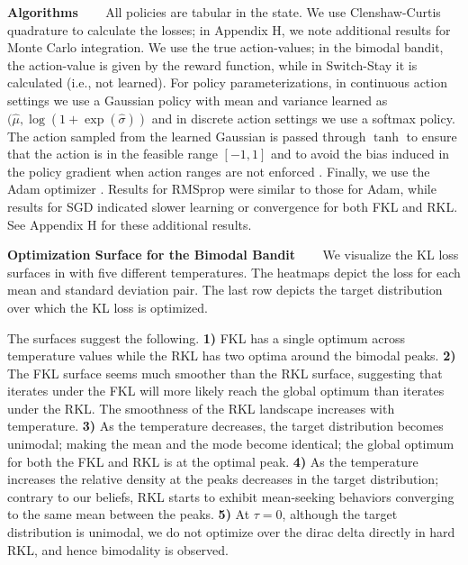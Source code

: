 \documentclass{article}
\newcommand{\myparagraph}[1]{\textbf{#1} \ \ \ }
\begin{document}
\myparagraph{Algorithms} 
All policies are tabular in the state. We use Clenshaw-Curtis quadrature \citep{clenshaw1960method} to calculate the losses; in Appendix H, we note additional results for Monte Carlo integration. We use the true action-values; in the bimodal bandit, the action-value is given by the reward function, while in Switch-Stay it is calculated (i.e., not learned). For policy parameterizations, in continuous action settings we use a Gaussian policy with mean and variance learned as $(\hat{\mu}, \log(1+\exp(\hat{\sigma}))$ and in discrete action settings we use a softmax policy. The action sampled from the learned Gaussian is passed through $\tanh$ to ensure that the action is in the feasible range $[-1, 1]$ and to avoid the bias induced in the policy gradient when action ranges are not enforced \citep{chou2017improving}. Finally, we use the Adam optimizer \citep{kingma2014adam}. Results for RMSprop were similar to those for Adam, while results for SGD indicated slower learning or convergence for both FKL and RKL. See Appendix H for these additional results. 


\myparagraph{Optimization Surface for the Bimodal Bandit}
We visualize the KL loss surfaces in  with five different temperatures. The heatmaps depict the loss for each mean and standard deviation pair. The last row depicts the target distribution over which the KL loss is optimized. 

The surfaces suggest the following. 
\textbf{1)} FKL has a single optimum across temperature values while the RKL has two optima around the bimodal peaks.
\textbf{2)} The FKL surface seems much smoother than the RKL surface, suggesting that iterates under the FKL will more likely reach the global optimum than iterates under the RKL. The smoothness of the RKL landscape increases with temperature.
\textbf{3)} As the temperature decreases, the target distribution becomes unimodal; making the mean and the mode become identical; the global optimum for both the FKL and RKL is at the optimal peak.
\textbf{4)} As the temperature increases the relative density at the peaks decreases in the target distribution; contrary to our beliefs, RKL starts to exhibit mean-seeking behaviors converging to the same mean between the peaks. 
\textbf{5)} At $\tau=0$, although the target distribution is unimodal, we do not optimize over the dirac delta directly in hard RKL, and hence bimodality is observed.
\end{document}
